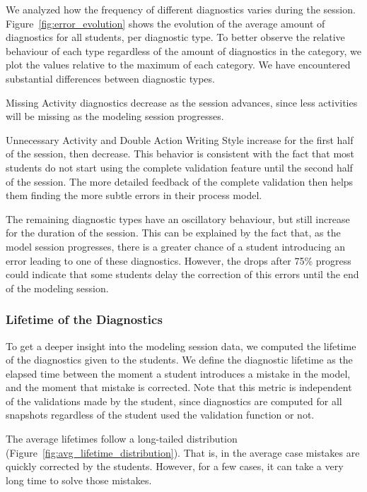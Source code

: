 \newcommand{\expnumber}[2]{{#1}\mathrm{e}{#2}}

We analyzed how the frequency of different diagnostics varies during the
session. Figure~\ref{fig:error_evolution} shows the evolution of the average
amount of diagnostics for all students, per diagnostic type. To better observe
the relative behaviour of each type regardless of the amount of diagnostics in
the category, we plot the values relative to the maximum of each category. We
have encountered substantial differences between diagnostic types.

Missing Activity diagnostics decrease as the session advances, since less
activities will be missing as the modeling session progresses.

Unnecessary Activity and Double Action Writing Style increase for the first half
of the session, then decrease. This behavior is consistent with the fact that
most students do not start using the complete validation feature until the
second half of the session. The more detailed feedback of the complete
validation then helps them finding the more subtle errors in their process
model.

The remaining diagnostic types have an oscillatory behaviour, but still increase
for the duration of the session. This can be explained by the fact that, as the
model session progresses, there is a greater chance of a student introducing an
error leading to one of these diagnostics. However, the drops after 75\%
progress could indicate that some students delay the correction of this errors
until the end of the modeling session.


\subsubsection{Lifetime of the Diagnostics}
To get a deeper insight into the modeling session data, we computed the lifetime
of the diagnostics given to the students. We define the diagnostic lifetime as
the elapsed time between the moment a student introduces a mistake in the model,
and the moment that mistake is corrected. Note that this metric is independent
of the validations made by the student, since diagnostics are computed for all
snapshots regardless of the student used the validation function or not.

The average lifetimes follow a long-tailed distribution
(Figure~\ref{fig:avg_lifetime_distribution}). That is, in the average case
mistakes are quickly corrected by the students. However, for a few cases, it can
take a very long time to solve those mistakes.


